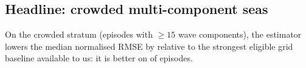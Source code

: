 \documentclass[review]{elsarticle}
\begin{document}
\subsection{Headline: crowded multi-component seas}
\label{sec:res_headline}


On the crowded stratum (episodes with $\geq 15$ wave components), the estimator
lowers the median normalised RMSE by \BOneRel{} relative to the strongest eligible
grid baseline available to us: it is better on \BOneBetter{} of \BOneN{} episodes.
\end{document}
